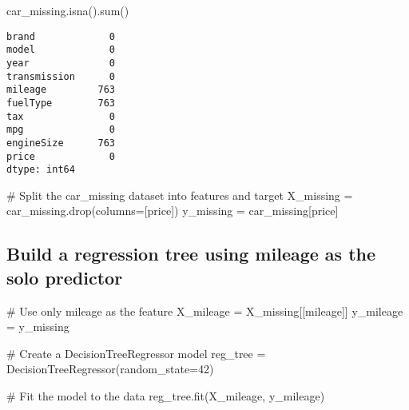 \documentclass[
  letterpaper,
  DIV=11,
  numbers=noendperiod]{scrreprt}
\newenvironment{Shaded}{\begin{snugshade}}{\end{snugshade}}
\newcommand{\BuiltInTok}[1]{\textcolor[rgb]{0.00,0.23,0.31}{#1}}
\newcommand{\CommentTok}[1]{\textcolor[rgb]{0.37,0.37,0.37}{#1}}
\newcommand{\DecValTok}[1]{\textcolor[rgb]{0.68,0.00,0.00}{#1}}
\newcommand{\NormalTok}[1]{\textcolor[rgb]{0.00,0.23,0.31}{#1}}
\newcommand{\OperatorTok}[1]{\textcolor[rgb]{0.37,0.37,0.37}{#1}}
\newcommand{\StringTok}[1]{\textcolor[rgb]{0.13,0.47,0.30}{#1}}
\begin{document}
\begin{Shaded}
\begin{Highlighting}[]
\NormalTok{car\_missing.isna().}\BuiltInTok{sum}\NormalTok{()}
\end{Highlighting}
\end{Shaded}

\begin{verbatim}
brand             0
model             0
year              0
transmission      0
mileage         763
fuelType        763
tax               0
mpg               0
engineSize      763
price             0
dtype: int64
\end{verbatim}

\begin{Shaded}
\begin{Highlighting}[]
\CommentTok{\# Split the car\_missing dataset into features and target}
\NormalTok{X\_missing }\OperatorTok{=}\NormalTok{ car\_missing.drop(columns}\OperatorTok{=}\NormalTok{[}\StringTok{\textquotesingle{}price\textquotesingle{}}\NormalTok{])}
\NormalTok{y\_missing }\OperatorTok{=}\NormalTok{ car\_missing[}\StringTok{\textquotesingle{}price\textquotesingle{}}\NormalTok{]}
\end{Highlighting}
\end{Shaded}

\subsection{Build a regression tree using mileage as the solo
predictor}\label{build-a-regression-tree-using-mileage-as-the-solo-predictor}

\begin{Shaded}
\begin{Highlighting}[]
\CommentTok{\# Use only \textquotesingle{}mileage\textquotesingle{} as the feature}
\NormalTok{X\_mileage }\OperatorTok{=}\NormalTok{ X\_missing[[}\StringTok{\textquotesingle{}mileage\textquotesingle{}}\NormalTok{]]}
\NormalTok{y\_mileage }\OperatorTok{=}\NormalTok{ y\_missing}
\end{Highlighting}
\end{Shaded}

\begin{Shaded}
\begin{Highlighting}[]
\CommentTok{\# Create a DecisionTreeRegressor model}
\NormalTok{reg\_tree }\OperatorTok{=}\NormalTok{ DecisionTreeRegressor(random\_state}\OperatorTok{=}\DecValTok{42}\NormalTok{)}

\CommentTok{\# Fit the model to the data}
\NormalTok{reg\_tree.fit(X\_mileage, y\_mileage)}
\end{Highlighting}
\end{Shaded}
\end{document}
